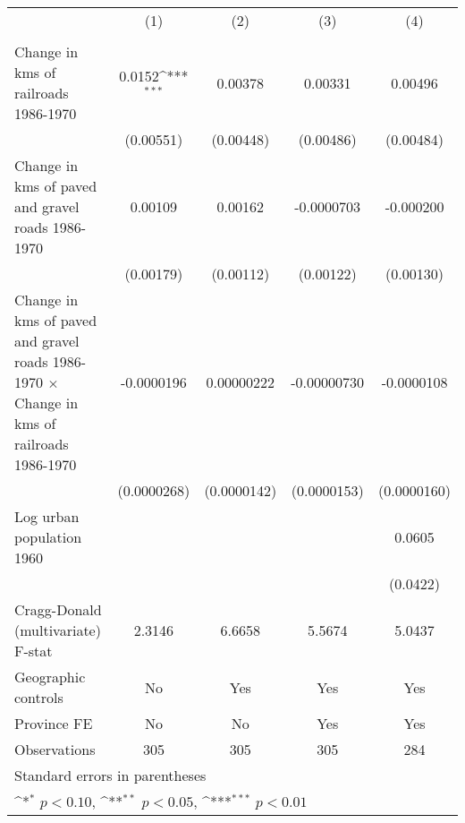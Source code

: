 {
\def\sym#1{\ifmmode^{#1}\else\(^{#1}\)\fi}
\begin{tabular}{l*{4}{c}}
\hline\hline
                &\multicolumn{1}{c}{(1)}&\multicolumn{1}{c}{(2)}&\multicolumn{1}{c}{(3)}&\multicolumn{1}{c}{(4)}\\
                &\multicolumn{1}{c}{}&\multicolumn{1}{c}{}&\multicolumn{1}{c}{}&\multicolumn{1}{c}{}\\
\hline
Change in kms of railroads 1986-1970&   0.0152\sym{***}&  0.00378         &  0.00331         &  0.00496         \\
                &(0.00551)         &(0.00448)         &(0.00486)         &(0.00484)         \\
[1em]
Change in kms of paved and gravel roads 1986-1970&  0.00109         &  0.00162         &-0.0000703         &-0.000200         \\
                &(0.00179)         &(0.00112)         &(0.00122)         &(0.00130)         \\
[1em]
Change in kms of paved and gravel roads 1986-1970 $\times$ Change in kms of railroads 1986-1970&-0.0000196         &0.00000222         &-0.00000730         &-0.0000108         \\
                &(0.0000268)         &(0.0000142)         &(0.0000153)         &(0.0000160)         \\
[1em]
Log urban population 1960&                  &                  &                  &   0.0605         \\
                &                  &                  &                  & (0.0422)         \\
\hline
Cragg-Donald (multivariate) F-stat&   2.3146         &   6.6658         &   5.5674         &   5.0437         \\
Geographic controls&       No         &      Yes         &      Yes         &      Yes         \\
Province FE     &       No         &       No         &      Yes         &      Yes         \\
Observations    &      305         &      305         &      305         &      284         \\
\hline\hline
\multicolumn{5}{l}{\footnotesize Standard errors in parentheses}\\
\multicolumn{5}{l}{\footnotesize \sym{*} \(p<0.10\), \sym{**} \(p<0.05\), \sym{***} \(p<0.01\)}\\
\end{tabular}
}

